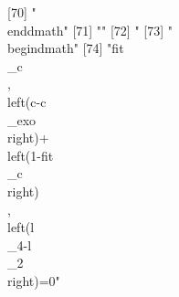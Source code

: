  [70] "\\end{dmath}"                                                                                                                                                                                                                                                                                                                                                                                                                                                                                
 [71] ""                                                                                                                                                                                                                                                                                                                                                                                                                                                                                            
 [72] "%
 [73] "\\begin{dmath}"                                                                                                                                                                                                                                                                                                                                                                                                                                                                              
 [74] "{{fit\\_c}}\\, \\left({c}-{{c\\_exo}}\\right)+\\left(1-{{fit\\_c}}\\right)\\, \\left({{l\\_4}}-{{l\\_2}}\\right)=0"                                                                                                                                                                                                                                                                                                                                                                          
